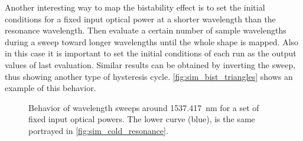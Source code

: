 Another interesting way to map the bistability effect is to set the initial conditions for a fixed input optical power at a shorter wavelength than the resonance wavelength.
Then evaluate a certain number of sample wavelengths during a sweep toward longer wavelengths until the whole shape is mapped.
Also in this case it is important to set the initial conditions of each run as the output values of last evaluation.
Similar results can be obtained by inverting the sweep, thus showing another type of hysteresis cycle.
\autoref{fig:sim_bist_triangles} shows an example of this behavior.

\begin{figure}[ht]
	\centering
	
	\caption{Behavior of wavelength sweeps around \SI{1537.417}{\nm} for a set of fixed input optical powers. The lower curve (blue), is the same portrayed in \autoref{fig:sim_cold_resonance}. }
	\label{fig:sim_bist_triangles}
\end{figure}